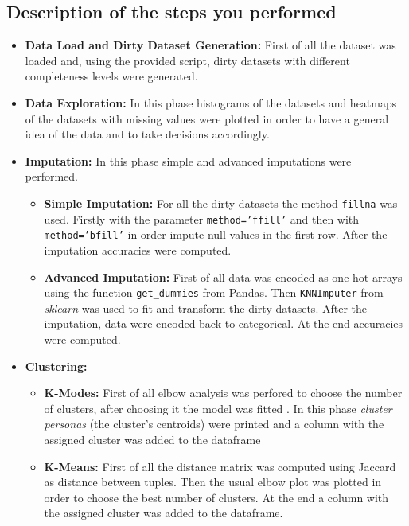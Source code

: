 \documentclass{article}
\begin{document}
\subsection{Description of the steps you performed}
\begin{itemize}
	\item\textbf{Data Load and Dirty Dataset Generation:} First of all the dataset was loaded and, using the provided script, dirty datasets with different completeness levels were generated.
	\item\textbf{Data Exploration:} In this phase histograms of the datasets and heatmaps of the datasets with missing values were plotted in order to have a general idea of the data and to take decisions accordingly.
	\item\textbf{Imputation:} In this phase simple and advanced imputations were performed.
		\begin{itemize}
			\item\textbf{Simple Imputation:} For all the dirty datasets the method \texttt{fillna} was used. Firstly with the parameter \texttt{method='ffill'} and then with \texttt{method='bfill'} in order impute null values in the first row. After the imputation accuracies were computed.
			\item\textbf{Advanced Imputation:} First of all data was encoded as one hot arrays using the function \texttt{get\_dummies} from Pandas. Then \texttt{KNNImputer} from \emph{sklearn} was used to fit and transform the dirty datasets. After the imputation, data were encoded back to categorical. At the end accuracies were computed.

		\end{itemize}
	\item\textbf{Clustering:}
		\begin{itemize}
			\item\textbf{K-Modes:} First of all elbow analysis was perfored to choose the number of clusters, after choosing it the model was fitted . In this phase \emph{cluster personas} (the cluster's centroids) were printed and a column with the assigned cluster was added to the dataframe
			\item\textbf{K-Means:} First of all the distance matrix was computed using Jaccard as distance between tuples. Then the usual elbow plot was plotted in order to choose the best number of clusters. At the end a column with the assigned cluster was added to the dataframe.
		\end{itemize}
\end{itemize}
\newpage
\end{document}
